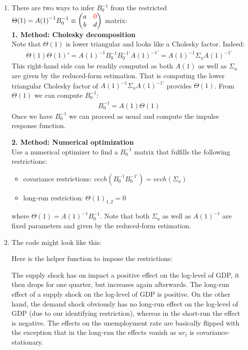 \begin{enumerate}
\item There are two ways to infer \(B_0^{-1}\) from the restricted \(\Theta(1) = {A(1)}^{-1} B_0^{-1} \equiv \begin{pmatrix} a & \textcolor{red}{0}\\ b & d \end{pmatrix}\) matrix:
\\
\textbf{1. Method: Cholesky decomposition}
\\
Note that \(\Theta(1)\) is lower triangular and looks like a Cholesky factor. Indeed:
\begin{align*}
    \Theta(1) \Theta(1)' = {A(1)}^{-1} B_0^{-1} B_0^{-1'} {A(1)}^{-1'} = {A(1)}^{-1} \Sigma_u {A(1)}^{-1'}
\end{align*}
This right-hand side can be readily computed as both \(A(1)\) as well as \(\Sigma_u\) are given by the reduced-form estimation.
That is computing the lower triangular Cholesky factor of \({A(1)}^{-1} \Sigma_u {A(1)}^{-1'}\) provides \(\Theta(1)\).
From \(\Theta(1)\) we can compute \(B_0^{-1}\):
\begin{align*}
B_0^{-1} = A(1)\Theta(1)
\end{align*}
Once we have \(B_0^{-1}\) we can proceed as usual and compute the impulse response function.

\textbf{2. Method: Numerical optimization}
\\
Use a numerical optimizer to find a \(B_0^{-1}\) matrix that fulfills the following restrictions:
\begin{itemize}
    \item covariance restrictions: \(vech(B_0^{-1} B_0^{-1'}) = vech(\Sigma_u)\)
    \item long-run restriction: \(\Theta(1)_{1,2} = 0\)
\end{itemize}
where \(\Theta(1) = {A(1)}^{-1} B_0^{-1}\).
Note that both \(\Sigma_u\) as well as \({A(1)}^{-1}\) are fixed parameters and given by the reduced-form estimation.

\item The code might look like this:

Here is the helper function to impose the restrictions:

The supply shock has on impact a positive effect on the log-level of GDP, it then drops for one quarter, but increases again afterwards.
The long-run effect of a supply shock on the log-level of GDP is positive.
On the other hand, the demand shock obviously has no long-run effect on the log-level of GDP (due to our identifying restriction),
  whereas in the short-run the effect is negative.
The effects on the unemployment rate are basically flipped with the exception that in the long-run the effects vanish as \(ur_t\) is covariance-stationary.
\end{enumerate}